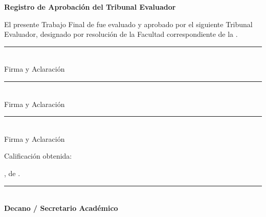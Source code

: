 \newpage
\thispagestyle{empty}
\vspace*{0.5cm}

\begin{center}
    {\large \bfseries \textcolor{Micolor1}{Registro de Aprobación del Tribunal Evaluador}}
\end{center}

\vspace{0.5cm}

\noindent El presente Trabajo Final de \textbf{\programaTesis} fue evaluado y aprobado por el siguiente Tribunal Evaluador, designado por resolución de la Facultad correspondiente de la \universidadTesis.

\vspace{1.2cm}

\noindent
\begin{minipage}[t]{6.5cm}
    \vspace{1.8cm}
    \rule{6cm}{0.4pt}\\[0.3em]
    \centering\small Firma y Aclaración
\end{minipage}
\hfill
\begin{minipage}[t]{6.5cm}
    \vspace{1.8cm}
    \rule{6cm}{0.4pt}\\[0.3em]
    \centering\small Firma y Aclaración
\end{minipage}

\vspace{1.2cm}

\noindent
\begin{minipage}[t]{6.5cm}
    \vspace{1.8cm}
    \rule{6cm}{0.4pt}\\[0.3em]
    \centering\small Firma y Aclaración
\end{minipage}

\vspace{1.2cm}

\noindent Calificación obtenida: \underline{\hspace{6cm}}

\vspace{0.8cm}

\noindent \ciudadTesis, \underline{\hspace{4cm}} de \anioTesis.

\vspace{1.2cm}

\begin{center}
    \rule{6cm}{0.4mm}\\[0.3em]
    \textbf{Decano / Secretario Académico}\\
    \universidadTesis
\end{center}
